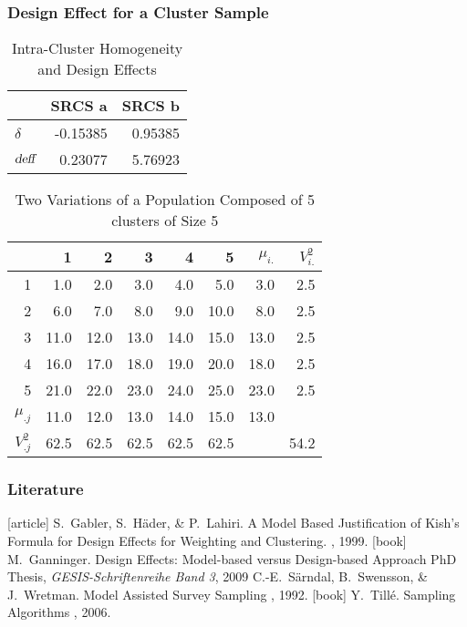 \documentclass[10pt]{beamer}\usepackage[]{graphicx}\usepackage[]{color}
\newcommand{\deff}{\ensuremath{\text{\slshape deff}}}
\begin{document}
\begin{frame}[fragile]\frametitle{Design Effect for a Cluster Sample}
\begin{table}[ht]
\centering
\caption{Intra-Cluster Homogeneity and Design Effects} 
\begin{tabular}{l|rr}
  & SRCS a & SRCS b \\ 
  \hline
$\delta$ & -0.15385 & 0.95385 \\ 
  $\deff$ & 0.23077 & 5.76923 \\ 
  \end{tabular}
\end{table}
\begin{table}[ht]
\centering
\caption{Two Variations of a Population Composed of 5
clusters of Size 5} 
\begin{tabular}{r|rrrrr|r|r}
  & 1 & 2 & 3 & 4 & 5 & $\mu_{i.}$ & $V^2_{i.}$ \\ 
  \hline
1 & 1.0 & 2.0 & 3.0 & 4.0 & 5.0 & 3.0 & 2.5 \\ 
  2 & 6.0 & 7.0 & 8.0 & 9.0 & 10.0 & 8.0 & 2.5 \\ 
  3 & 11.0 & 12.0 & 13.0 & 14.0 & 15.0 & 13.0 & 2.5 \\ 
  4 & 16.0 & 17.0 & 18.0 & 19.0 & 20.0 & 18.0 & 2.5 \\ 
  5 & 21.0 & 22.0 & 23.0 & 24.0 & 25.0 & 23.0 & 2.5 \\ 
   \hline
$\mu_{.j}$ & 11.0 & 12.0 & 13.0 & 14.0 & 15.0 & 13.0 &  \\ 
   \hline
$V^2_{.j}$ & 62.5 & 62.5 & 62.5 & 62.5 & 62.5 &  & 54.2 \\ 
  \end{tabular}
\end{table}

\end{frame}

\begin{frame}[allowframebreaks]\frametitle{Literature}    
  \begin{thebibliography}{10}    
   [article]
  S.~Gabler, S.~H\"{a}der, \& P.~Lahiri.
    \newblock  A Model Based Justification of
Kish's Formula for Design Effects for Weighting and Clustering.
    , 1999.
  [book]
   M.~Ganninger.
  \newblock  Design Effects: Model-based versus Design-based Approach
  \newblock  PhD Thesis, {\em GESIS-Schriftenreihe Band 3}, 2009
    C.-E.~S\"{a}rndal, B.~Swensson, \& J.~Wretman.
    \newblock Model Assisted Survey Sampling
    , 1992.
    [book]
   Y.~Till\'{e}.
  \newblock  Sampling Algorithms
    , 2006.
  \end{thebibliography}
\end{frame} 
\end{document}
